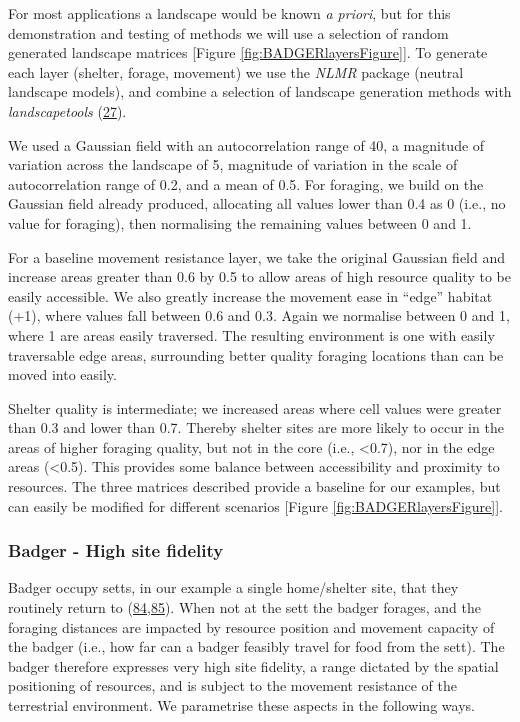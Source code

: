 \documentclass[10pt,a4paper]{article}
\begin{document}
For most applications a landscape would be known \emph{a priori}, but for this demonstration and testing of methods we will use a selection of random generated landscape matrices {[}Figure \ref{fig:BADGERlayersFigure}{]}.
To generate each layer (shelter, forage, movement) we use the \emph{NLMR} package (neutral landscape models), and combine a selection of landscape generation methods with \emph{landscapetools} (\protect\hyperlink{ref-Sciaini2018}{27}).

We used a Gaussian field with an autocorrelation range of 40, a magnitude of variation across the landscape of 5, magnitude of variation in the scale of autocorrelation range of 0.2, and a mean of 0.5.
For foraging, we build on the Gaussian field already produced, allocating all values lower than 0.4 as 0 (i.e., no value for foraging), then normalising the remaining values between 0 and 1.

For a baseline movement resistance layer, we take the original Gaussian field and increase areas greater than 0.6 by 0.5 to allow areas of high resource quality to be easily accessible.
We also greatly increase the movement ease in ``edge'' habitat (+1), where values fall between 0.6 and 0.3.
Again we normalise between 0 and 1, where 1 are areas easily traversed.
The resulting environment is one with easily traversable edge areas, surrounding better quality foraging locations than can be moved into easily.

Shelter quality is intermediate; we increased areas where cell values were greater than 0.3 and lower than 0.7.
Thereby shelter sites are more likely to occur in the areas of higher foraging quality, but not in the core (i.e., \textless0.7), nor in the edge areas (\textless0.5).
This provides some balance between accessibility and proximity to resources.
The three matrices described provide a baseline for our examples, but can easily be modified for different scenarios {[}Figure \ref{fig:BADGERlayersFigure}{]}.

\hypertarget{badger---high-site-fidelity}{%
\subsubsection{Badger - High site fidelity}\label{badger---high-site-fidelity}}

Badger occupy setts, in our example a single home/shelter site, that they routinely return to (\protect\hyperlink{ref-kowalczyk_daily_2006}{84},\protect\hyperlink{ref-feore_habitat_1999}{85}).
When not at the sett the badger forages, and the foraging distances are impacted by resource position and movement capacity of the badger (i.e., how far can a badger feasibly travel for food from the sett).
The badger therefore expresses very high site fidelity, a range dictated by the spatial positioning of resources, and is subject to the movement resistance of the terrestrial environment.
We parametrise these aspects in the following ways.
\end{document}
